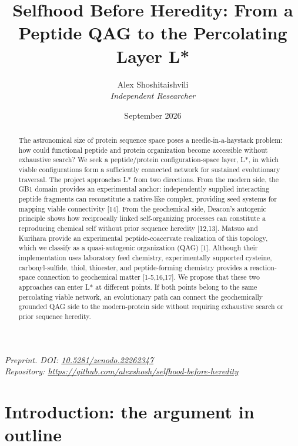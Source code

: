 \documentclass[11pt]{article}
\title{\textbf{Selfhood Before Heredity: From a Peptide QAG to the Percolating Layer L*}}
\author{Alex Shoshitaishvili\\ \textit{Independent Researcher}}
\date{September 2026}
\begin{document}
\maketitle

\begin{center}
\textit{Preprint. DOI: \href{https://doi.org/10.5281/zenodo.22262347}{10.5281/zenodo.22262347}}\\
\textit{Repository: \url{https://github.com/alexshosh/selfhood-before-heredity}}
\end{center}

\vspace{1em}

\begin{abstract}
\noindent
The astronomical size of protein sequence space poses a needle-in-a-haystack problem: how could functional peptide and protein organization become accessible without exhaustive search? We seek a peptide/protein configuration-space layer, L*, in which viable configurations form a sufficiently connected network for sustained evolutionary traversal. The project approaches L* from two directions. From the modern side, the GB1 domain provides an experimental anchor: independently supplied interacting peptide fragments can reconstitute a native-like complex, providing seed systems for mapping viable connectivity {[}14{]}. From the geochemical side, Deacon's autogenic principle shows how reciprocally linked self-organizing processes can constitute a reproducing chemical self without prior sequence heredity {[}12,13{]}. Matsuo and Kurihara provide an experimental peptide-coacervate realization of this topology, which we classify as a quasi-autogenic organization (QAG) {[}1{]}. Although their implementation uses laboratory feed chemistry, experimentally supported cysteine, carbonyl-sulfide, thiol, thioester, and peptide-forming chemistry provides a reaction-space connection to geochemical matter {[}1-5,16,17{]}. We propose that these two approaches can enter L* at different points. If both points belong to the same percolating viable network, an evolutionary path can connect the geochemically grounded QAG side to the modern-protein side without requiring exhaustive search or prior sequence heredity.
\end{abstract}

\hypertarget{introduction-the-argument-in-outline}{%
\section*{Introduction: the argument in outline}\label{introduction-the-argument-in-outline}}
\end{document}
